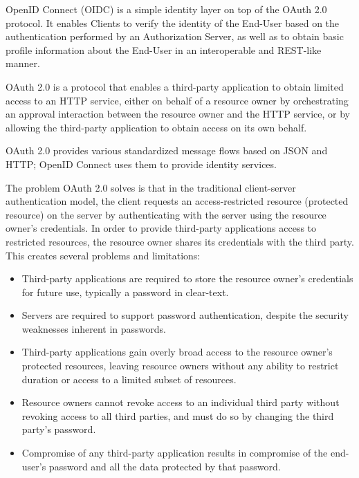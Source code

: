 OpenID Connect (OIDC) is a simple identity layer on top of the OAuth 2.0 protocol.
It enables Clients to verify the identity of the End-User based on the authentication performed by an Authorization Server,
as well as to obtain basic profile information about the End-User in an interoperable and REST-like manner.

OAuth 2.0 is a protocol that enables a third-party application to obtain limited access to an HTTP service,
either on behalf of a resource owner by orchestrating an approval interaction between the resource owner
and the HTTP service, or by allowing the third-party application to obtain access on its own behalf.

OAuth 2.0 provides various standardized message flows based on JSON and HTTP;
OpenID Connect uses them to provide identity services.

The problem OAuth 2.0 solves is that in the traditional client-server authentication model,
the client requests an access-restricted resource (protected resource)
on the server by authenticating with the server using the resource owner's credentials.
In order to provide third-party applications access to restricted resources,
the resource owner shares its credentials with the third party.
This creates several problems and limitations:

\begin{itemize}
    \item Third-party applications are required to store the resource owner's credentials for future use, typically
    a password in clear-text.
    \item Servers are required to support password authentication, despite the security weaknesses inherent in passwords.
    \item Third-party applications gain overly broad access to the resource owner's protected resources,
    leaving resource owners without any ability to restrict duration or access to a limited subset of resources.
    \item Resource owners cannot revoke access to an individual third party without revoking access to all third parties,
    and must do so by changing the third party's password.
    \item Compromise of any third-party application results in compromise of the end-user's password
    and all the data protected by that password.
\end{itemize}

